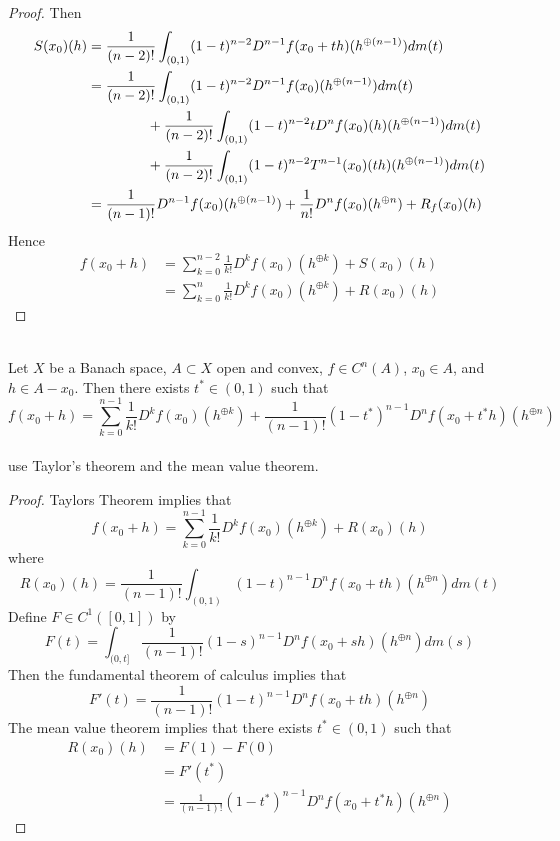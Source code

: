 \documentclass{book}
\begin{document}
\begin{proof}
	Then 
	\begin{align*}
	S(x_0)(h) 
	&= \frac{1}{(n-2)!}\int_{(0,1)} (1-t)^{n-2}D^{n-1}f(x_0 + th)(h^{\oplus (n-1)})d m(t) \\
	&= \frac{1}{(n-2)!}\int_{(0,1)} (1-t)^{n-2} D^{n-1}f(x_0)(h^{\oplus (n-1)}) dm(t) \\ 
	& \hspace{1.5cm} + \frac{1}{(n-2)!} \int_{(0,1)} (1-t)^{n-2}t D^{n}f(x_0)(h)(h^{\oplus (n-1)}) dm(t) \\
	& \hspace{1.5cm} + \frac{1}{(n-2)!} \int_{(0,1)} (1-t)^{n-2}T^{n-1}(x_0)(th)(h^{\oplus (n-1)}) dm(t) \\
	&= \frac{1}{(n-1)!}D^{n-1}f(x_0)(h^{\oplus (n-1)}) + \frac{1}{n!}D^{n}f(x_0)(h^{\oplus n}) + R_f(x_0)(h)
	\end{align*}
	Hence 
	\begin{align*}
	f(x_0 + h) 
	&= \sum_{k=0}^{n-2} \frac{1}{k!} D^k f(x_0)(h^{\oplus k}) + S(x_0)(h) \\
	&= \sum_{k=0}^{n} \frac{1}{k!} D^k f(x_0)(h^{\oplus k}) + R(x_0)(h) 
	\end{align*}
	
	\end{proof}
	
	
	\begin{ex} \lex{} \\
	Let $X$ be a Banach space, $A \subset X$ open and convex, $f \in C^{n}(A)$, $x_0 \in A$, and $h \in A - x_0$. Then there exists $t^* \in (0,1)$ such that $$f(x_0 + h) = \sum_{k=0}^{n-1} \frac{1}{k!} D^k f(x_0)(h^{\oplus k}) + \frac{1}{(n-1)!} (1-t^*)^{n-1}D^{n}f(x_0 + t^*h)(h^{\oplus n})$$ \\
	 use Taylor's theorem and the mean value theorem.
	\end{ex}	
	
	\begin{proof}
	Taylors Theorem implies that 
	$$f(x_0 + h) = \sum_{k=0}^{n-1} \frac{1}{k!} D^k f(x_0)(h^{\oplus k}) + R(x_0)(h)$$ 
	where 
	$$R(x_0)(h) =  \frac{1}{(n-1)!}\int_{(0,1)} (1-t)^{n-1}D^{n}f(x_0 + th)(h^{\oplus n})d m(t)$$ 
	Define $F \in C^1([0,1])$ by $$F(t) = \int_{(0,t]}\frac{1}{(n-1)!}(1-s)^{n-1}D^{n}f(x_0 + sh)(h^{\oplus n})d m(s)$$ Then the fundamental theorem of calculus implies that 
	$$F'(t) = \frac{1}{(n-1)!}(1-t)^{n-1}D^{n}f(x_0 + th)(h^{\oplus n})$$ 
	The mean value theorem implies that there exists $t^* \in (0,1)$ such that 
	\begin{align*}
	R(x_0)(h)
	&= F(1) - F(0) \\
	&= F'(t^*) \\
	&= \frac{1}{(n-1)!}(1-t^*)^{n-1}D^{n}f(x_0 + t^*h)(h^{\oplus n})
	\end{align*}
	\end{proof}	
\end{document}
